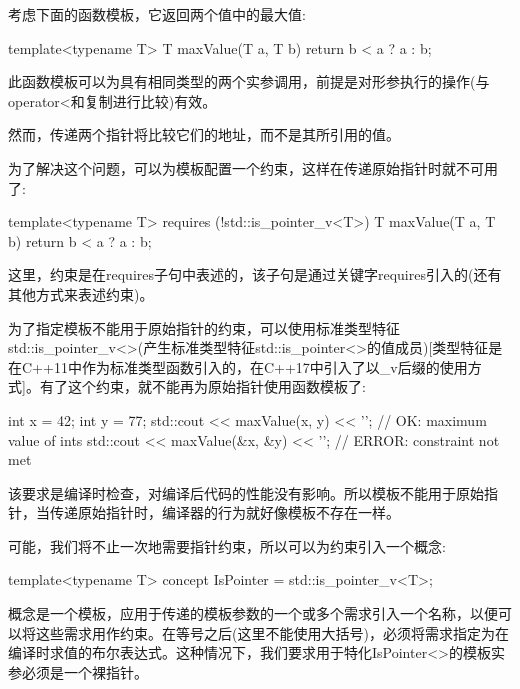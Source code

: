 

考虑下面的函数模板，它返回两个值中的最大值:

\begin{cpp}
template<typename T>
T maxValue(T a, T b) {
	return b < a ? a : b;
}
\end{cpp}

此函数模板可以为具有相同类型的两个实参调用，前提是对形参执行的操作(与operator<和复制进行比较)有效。

然而，传递两个指针将比较它们的地址，而不是其所引用的值。




为了解决这个问题，可以为模板配置一个约束，这样在传递原始指针时就不可用了:

\begin{cpp}
template<typename T>
requires (!std::is_pointer_v<T>)
T maxValue(T a, T b)
{
	return b < a ? a : b;
}
\end{cpp}

这里，约束是在requires子句中表述的，该子句是通过关键字requires引入的(还有其他方式来表述约束)。

为了指定模板不能用于原始指针的约束，可以使用标准类型特征std::is\_pointer\_v<>(产生标准类型特征std::is\_pointer<>的值成员)[类型特征是在C++11中作为标准类型函数引入的，在C++17中引入了以\_v后缀的使用方式]。有了这个约束，就不能再为原始指针使用函数模板了:

\begin{cpp}
int x = 42;
int y = 77;
std::cout << maxValue(x, y) << '\n'; // OK: maximum value of ints
std::cout << maxValue(&x, &y) << '\n'; // ERROR: constraint not met
\end{cpp}

该要求是编译时检查，对编译后代码的性能没有影响。所以模板不能用于原始指针，当传递原始指针时，编译器的行为就好像模板不存在一样。


可能，我们将不止一次地需要指针约束，所以可以为约束引入一个概念:

\begin{cpp}
template<typename T>
concept IsPointer = std::is_pointer_v<T>;
\end{cpp}

概念是一个模板，应用于传递的模板参数的一个或多个需求引入一个名称，以便可以将这些需求用作约束。在等号之后(这里不能使用大括号)，必须将需求指定为在编译时求值的布尔表达式。这种情况下，我们要求用于特化IsPointer<>的模板实参必须是一个裸指针。

